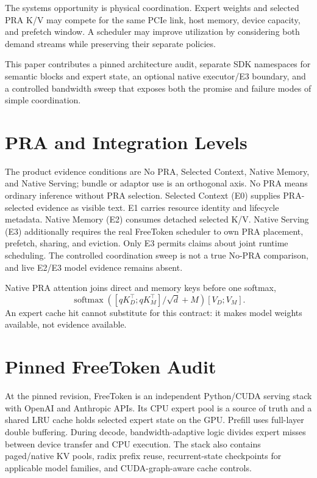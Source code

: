 \documentclass[10pt]{article}
\begin{document}
The systems opportunity is physical coordination. Expert weights and selected
PRA K/V may compete for the same PCIe link, host memory, device capacity, and
prefetch window. A scheduler may improve utilization by considering both demand
streams while preserving their separate policies.

This paper contributes a pinned architecture audit, separate SDK namespaces for
semantic blocks and expert state, an optional native executor/E3 boundary, and
a controlled bandwidth sweep that exposes both the promise and failure modes of
simple coordination.

\section{PRA and Integration Levels}
The product evidence conditions are No PRA, Selected Context, Native Memory,
and Native Serving; bundle or adaptor use is an orthogonal axis. No PRA means
ordinary inference without PRA selection. Selected Context (E0) supplies
PRA-selected evidence as visible text. E1 carries resource identity and
lifecycle metadata. Native Memory (E2) consumes detached selected K/V. Native
Serving (E3) additionally requires the real FreeToken scheduler to own PRA
placement, prefetch, sharing, and eviction. Only E3 permits claims about joint
runtime scheduling. The controlled coordination sweep is not a true No-PRA
comparison, and live E2/E3 model evidence remains absent.

Native PRA attention joins direct and memory keys before one softmax,
\begin{equation}
 \operatorname{softmax}\!\left(
 [qK_D^\top;qK_M^\top]/\sqrt d + M
 \right)[V_D;V_M].
\end{equation}
An expert cache hit cannot substitute for this contract: it makes model weights
available, not evidence available.

\section{Pinned FreeToken Audit}
At the pinned revision, FreeToken is an independent Python/CUDA serving stack
with OpenAI and Anthropic APIs. Its CPU expert pool is a source of truth and a
shared LRU cache holds selected expert state on the GPU. Prefill uses full-layer
double buffering. During decode, bandwidth-adaptive logic divides expert misses
between device transfer and CPU execution. The stack also contains paged/native
KV pools, radix prefix reuse, recurrent-state checkpoints for applicable model
families, and CUDA-graph-aware cache controls.
\end{document}
